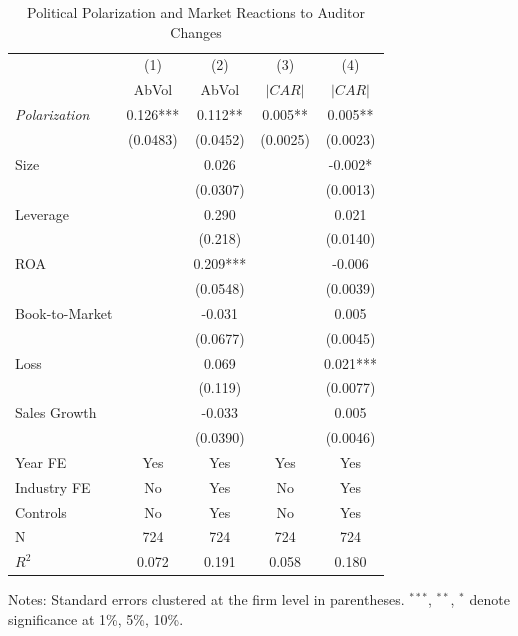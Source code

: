 \begin{table}[htbp]
\centering
\caption{Political Polarization and Market Reactions to Auditor Changes}
\label{tab:main}
\begin{tabular}{lcccc}
\toprule
 & (1) & (2) & (3) & (4) \\
 & AbVol & AbVol & $|CAR|$ & $|CAR|$ \\
\midrule
\textit{Polarization} & 0.126*** & 0.112** & 0.005** & 0.005** \\
 & (0.0483) & (0.0452) & (0.0025) & (0.0023) \\
Size &  & 0.026 &  & -0.002* \\
 &  & (0.0307) &  & (0.0013) \\
Leverage &  & 0.290 &  & 0.021 \\
 &  & (0.218) &  & (0.0140) \\
ROA &  & 0.209*** &  & -0.006 \\
 &  & (0.0548) &  & (0.0039) \\
Book-to-Market &  & -0.031 &  & 0.005 \\
 &  & (0.0677) &  & (0.0045) \\
Loss &  & 0.069 &  & 0.021*** \\
 &  & (0.119) &  & (0.0077) \\
Sales Growth &  & -0.033 &  & 0.005 \\
 &  & (0.0390) &  & (0.0046) \\
\midrule
Year FE & Yes & Yes & Yes & Yes \\
Industry FE & No & Yes & No & Yes \\
Controls & No & Yes & No & Yes \\
N & 724 & 724 & 724 & 724 \\
$R^2$ & 0.072 & 0.191 & 0.058 & 0.180 \\
\bottomrule
\end{tabular}
\begin{flushleft}
\footnotesize Notes: Standard errors clustered at the firm level in parentheses. $^{***}$, $^{**}$, $^{*}$ denote significance at 1\%, 5\%, 10\%.
\end{flushleft}
\end{table}